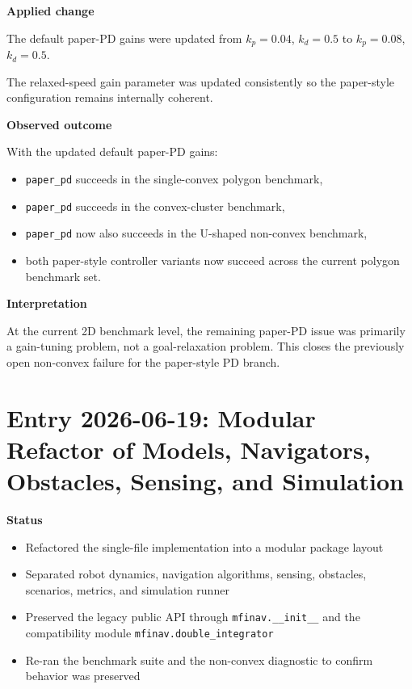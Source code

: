 \documentclass[11pt]{article}
\begin{document}
\textbf{Applied change}

The default paper-PD gains were updated from
\(k_p = 0.04\), \(k_d = 0.5\)
to
\(k_p = 0.08\), \(k_d = 0.5\).

The relaxed-speed gain parameter was updated consistently so the paper-style
configuration remains internally coherent.

\textbf{Observed outcome}

With the updated default paper-PD gains:

\begin{itemize}[leftmargin=*]
  \item \texttt{paper\_pd} succeeds in the single-convex polygon benchmark,
  \item \texttt{paper\_pd} succeeds in the convex-cluster benchmark,
  \item \texttt{paper\_pd} now also succeeds in the U-shaped non-convex benchmark,
  \item both paper-style controller variants now succeed across the current polygon benchmark set.
\end{itemize}

\textbf{Interpretation}

At the current 2D benchmark level, the remaining paper-PD issue was primarily a
gain-tuning problem, not a goal-relaxation problem. This closes the previously
open non-convex failure for the paper-style PD branch.

\section*{Entry 2026-06-19: Modular Refactor of Models, Navigators, Obstacles, Sensing, and Simulation}

\textbf{Status}

\begin{itemize}[leftmargin=*]
  \item Refactored the single-file implementation into a modular package layout
  \item Separated robot dynamics, navigation algorithms, sensing, obstacles, scenarios, metrics, and simulation runner
  \item Preserved the legacy public API through \texttt{mfinav.\_\_init\_\_} and the compatibility module \texttt{mfinav.double\_integrator}
  \item Re-ran the benchmark suite and the non-convex diagnostic to confirm behavior was preserved
\end{itemize}
\end{document}
